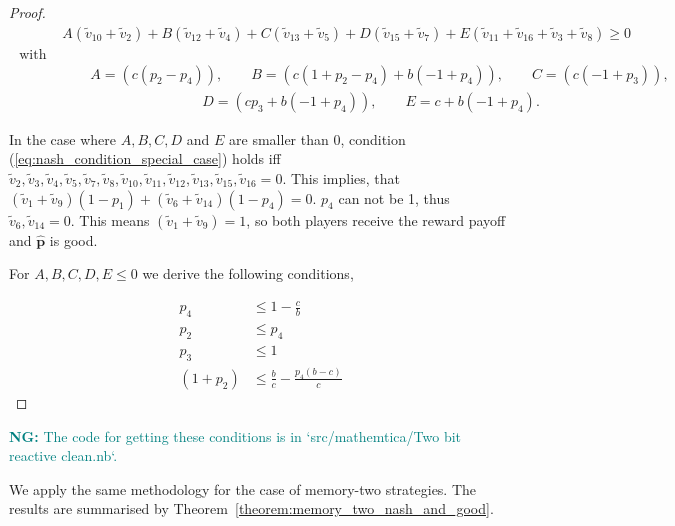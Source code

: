 \documentclass{article}
\theoremstyle{definition}
\newcommand{\nikoleta}[1]{\textcolor{teal}{{\bf NG:} #1}}
\begin{document}
\begin{proof}
  \begin{align}
    & A (\tilde{v}_{10} + \tilde{v}_{2}) + B (\tilde{v}_{12} + \tilde{v}_4) 
    + C (\tilde{v}_{13} + \tilde{v}_5) + D (\tilde{v}_{15} + \tilde{v}_7) + E (\tilde{v}_{11} + \tilde{v}_{16} + \tilde{v}_3 + \tilde{v}_8) \geq  0 \label{eq:nash_condition_special_case} \\ \text{ with } \nonumber \\ 
    & \qquad A = (c (p_2 - p_4)), \qquad B = (c (1 + p_2 - p_4) + b (-1 + p_4)), \qquad C = ( c (-1 + p_3)),  \nonumber \\
    & \qquad  \qquad  \qquad \qquad \qquad D = (c p_3 + b (-1 + p_4)), \qquad E = c + 
    b (-1 + p_4). \nonumber
  \end{align}
  
  In the case where \(A, B, C, D\) and \(E\) are smaller than 0, condition
  (\ref{eq:nash_condition_special_case}) holds iff \(\tilde{v}_2, \tilde{v}_3,
  \tilde{v}_4, \tilde{v}_5, \tilde{v}_7, \tilde{v}_8, \tilde{v}_{10},
  \tilde{v}_{11}, \tilde{v}_{12}, \tilde{v}_{13}, \tilde{v}_{15}, \tilde{v}_{16} =
  0\). This implies, that \((\tilde{v}_1 + \tilde{v}_9) (1 - p_1) + (\tilde{v}_6 +
  \tilde{v}_{14}) (1 - p_4) = 0\). \(p_4\) can not be 1, thus \(\tilde{v}_6,
  \tilde{v}_{14} = 0\). This means \((\tilde{v}_1 + \tilde{v}_9) = 1\), so both
  players receive the reward payoff and \(\mathbf{\hat{p}}\) is good.
  
  For \(A, B, C, D, E \leq 0\) we derive the following conditions,
  
  \begin{align}\label{eq:nash_conditions}
    p_4       & \leq 1 - \frac{c}{b} \\
    p_2       & \leq p_4 \\
    p_3       & \leq 1 \\
    (1 + p_2) & \leq \frac{b}{c} - \frac{p_4 (b - c)}{c}
  \end{align}
  
  \end{proof}
  
\nikoleta{The code for getting these conditions is in `src/mathemtica/Two bit reactive clean.nb`.}

We apply the same methodology for the case of memory-two strategies. The results
are summarised by Theorem~\ref{theorem:memory_two_nash_and_good}.
  
\end{document}
